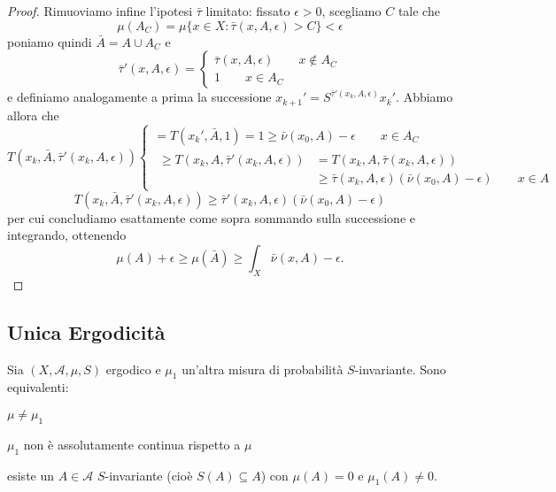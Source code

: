 \begin{proof}
Rimuoviamo infine l'ipotesi $\bar\tau$ limitato: fissato $\epsilon>0$, scegliamo $C$ tale che
\[\mu(A_C)=\mu\{x\in X: \bar\tau(x,A,\epsilon)>C\}<\epsilon\]
poniamo quindi $\bar A=A\cup A_C$ e
\[\bar\tau'(x,A,\epsilon)=\begin{cases}\bar\tau(x,A,\epsilon) \qquad x\notin A_C\\
					1 \qquad x\in A_C
  \end{cases}\]
e definiamo analogamente a prima la successione $x_{k+1}'=S^{\bar\tau'(x_k,A,\epsilon)}x_k'$. Abbiamo allora che
\[T(x_k,\bar A,\bar\tau'(x_k,A,\epsilon))
    \begin{cases} =T(x_k',\bar A,1)=1\geq \bar\nu(x_0,A)-\epsilon \qquad x\in A_C \\
		  \begin{split}\geq T(x_k,A,\bar\tau'(x_k,A,\epsilon))&=T(x_k,A,\bar\tau(x_k,A,\epsilon))\\
			&\geq \bar\tau(x_k,A,\epsilon)(\bar\nu(x_0,A)-\epsilon) \qquad x\in A \end{split}
    \end{cases}\]
\[T(x_k,\bar A,\bar\tau'(x_k,A,\epsilon))\geq \bar\tau'(x_k,A,\epsilon)(\bar\nu(x_0,A)-\epsilon)\]
per cui concludiamo esattamente come sopra sommando sulla successione e integrando, ottenendo
\[\mu(A)+\epsilon\geq\mu(\bar A)\geq \int_X \bar\nu(x,A)-\epsilon.\]
\end{proof}

\subsection{Unica Ergodicità}

\begin{esercizio}Sia $(X,\mathcal{A},\mu,S)$ ergodico e $\mu_1$ un'altra misura di probabilità $S$-invariante.
Sono equivalenti:
\begin{lista}
\item $\mu\neq\mu_1$
\item $\mu_1$ non è assolutamente continua rispetto a $\mu$
\item esiste un $A\in\mathcal{A}$ $S$-invariante (cioè $S(A)\subseteq A$) con $\mu(A)=0$ e $\mu_1(A)\neq 0$.
\end{lista}
\end{esercizio}

